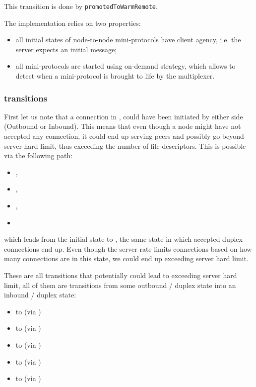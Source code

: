 \begin{detail}
  This transition is done by \texttt{promotedToWarmRemote}.

  The implementation relies on two properties:
  \begin{itemize}
    \item all initial states of node-to-node mini-protocols have client agency, i.e. the
      server expects an initial message;
    \item all mini-protocols are started using on-demand strategy, which allows
      to detect when a mini-protocol is brought to life by the multiplexer.
  \end{itemize}
\end{detail}


\subsubsection{\Prune{} transitions}
First let us note that a connection in \InboundStateDup{}, could have been
initiated by either side (Outbound or Inbound). This means that even though a node might have not
accepted any connection, it could end up serving peers and possibly go beyond
server hard limit, thus exceeding the number of file descriptors. This is
possible via the following path:

\begin{itemize}
  \item[] \Connected{},
  \item[] \NegotiatedDupOut{},
  \item[] \PromotedToWarmDupRem{},
  \item[] \DemotedToColdDupLoc{}
\end{itemize}

which leads from the initial state \InitialState{} to \InboundStateDup{}, the
same state in which accepted duplex connections end up. Even though the server
rate limits connections based on how many connections are in this state, we
could end up exceeding server hard limit.

These are all transitions that potentially could lead to exceeding server hard limit,
all of them are transitions from some outbound / duplex state into an inbound / duplex state:
\begin{itemize}
  \item \DuplexState{} to \InboundStateDup{} (via \DemotedToColdDupLoc{})
  \item \OutboundStateDupTau{} to \InboundStateDup{} (via \DemotedToColdDupLoc{})
  \item \OutboundIdleStateDup{} to \InboundStateDup{} (via \AwakeDupRem{})
  \item \OutboundStateDupTau{} to \DuplexState{} (via \PromotedToWarmDupRem{})
  \item \OutboundStateDup{} to \DuplexState{} (via \PromotedToWarmDupRem{})
\end{itemize}

